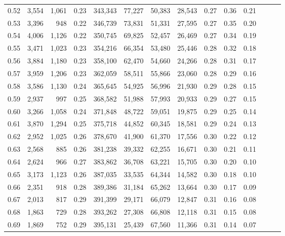 \begin{tabular}{rrrrrrrrrrrrrr}
0.52 &   3,554 &  1,061 &  0.23 &  343,343 &   77,227 &  50,383 &  28,543 &  0.27 &  0.36 &      0.21 \\
0.53 &   3,396 &    948 &  0.22 &  346,739 &   73,831 &  51,331 &  27,595 &  0.27 &  0.35 &      0.20 \\
0.54 &   4,006 &  1,126 &  0.22 &  350,745 &   69,825 &  52,457 &  26,469 &  0.27 &  0.34 &      0.19 \\
0.55 &   3,471 &  1,023 &  0.23 &  354,216 &   66,354 &  53,480 &  25,446 &  0.28 &  0.32 &      0.18 \\
0.56 &   3,884 &  1,180 &  0.23 &  358,100 &   62,470 &  54,660 &  24,266 &  0.28 &  0.31 &      0.17 \\
0.57 &   3,959 &  1,206 &  0.23 &  362,059 &   58,511 &  55,866 &  23,060 &  0.28 &  0.29 &      0.16 \\
0.58 &   3,586 &  1,130 &  0.24 &  365,645 &   54,925 &  56,996 &  21,930 &  0.29 &  0.28 &      0.15 \\
0.59 &   2,937 &    997 &  0.25 &  368,582 &   51,988 &  57,993 &  20,933 &  0.29 &  0.27 &      0.15 \\
0.60 &   3,266 &  1,058 &  0.24 &  371,848 &   48,722 &  59,051 &  19,875 &  0.29 &  0.25 &      0.14 \\
0.61 &   3,870 &  1,294 &  0.25 &  375,718 &   44,852 &  60,345 &  18,581 &  0.29 &  0.24 &      0.13 \\
0.62 &   2,952 &  1,025 &  0.26 &  378,670 &   41,900 &  61,370 &  17,556 &  0.30 &  0.22 &      0.12 \\
0.63 &   2,568 &    885 &  0.26 &  381,238 &   39,332 &  62,255 &  16,671 &  0.30 &  0.21 &      0.11 \\
0.64 &   2,624 &    966 &  0.27 &  383,862 &   36,708 &  63,221 &  15,705 &  0.30 &  0.20 &      0.10 \\
0.65 &   3,173 &  1,123 &  0.26 &  387,035 &   33,535 &  64,344 &  14,582 &  0.30 &  0.18 &      0.10 \\
0.66 &   2,351 &    918 &  0.28 &  389,386 &   31,184 &  65,262 &  13,664 &  0.30 &  0.17 &      0.09 \\
0.67 &   2,013 &    817 &  0.29 &  391,399 &   29,171 &  66,079 &  12,847 &  0.31 &  0.16 &      0.08 \\
0.68 &   1,863 &    729 &  0.28 &  393,262 &   27,308 &  66,808 &  12,118 &  0.31 &  0.15 &      0.08 \\
0.69 &   1,869 &    752 &  0.29 &  395,131 &   25,439 &  67,560 &  11,366 &  0.31 &  0.14 &      0.07 \\

\end{tabular}
